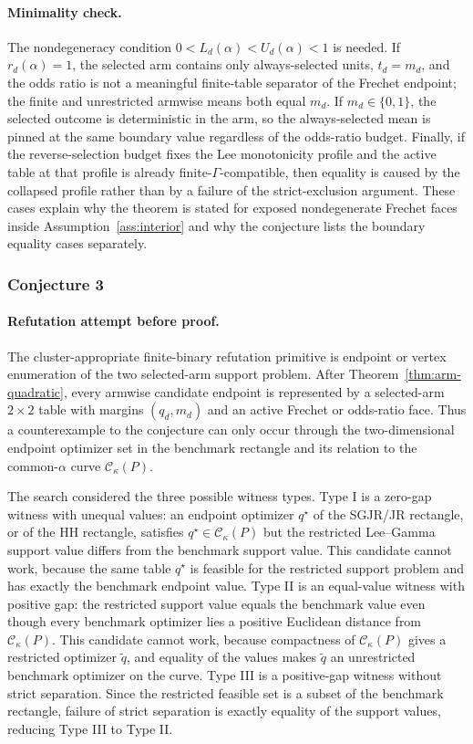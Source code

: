 \documentclass[11pt]{article}
\theoremstyle{definition}
\theoremstyle{plain}
\theoremstyle{remark}
\begin{document}
\paragraph{Minimality check.}
The nondegeneracy condition \(0<L_d(\alpha)<U_d(\alpha)<1\) is needed.  If
\(r_d(\alpha)=1\), the selected arm contains only always-selected units,
\(t_d=m_d\), and the odds ratio is not a meaningful finite-table separator of
the Frechet endpoint; the finite and unrestricted armwise means both equal
\(m_d\).  If \(m_d\in\{0,1\}\), the selected outcome is deterministic in the
arm, so the always-selected mean is pinned at the same boundary value
regardless of the odds-ratio budget.  Finally, if the reverse-selection budget
fixes the Lee monotonicity profile and the active table at that profile is
already finite-\(\Gamma\)-compatible, then equality is caused by the collapsed
profile rather than by a failure of the strict-exclusion argument.  These cases
explain why the theorem is stated for exposed nondegenerate Frechet faces
inside Assumption~\ref{ass:interior} and why the conjecture lists the boundary
equality cases separately.

\subsubsection*{Conjecture 3}
\paragraph{Refutation attempt before proof.}
The cluster-appropriate finite-binary refutation primitive is endpoint or
vertex enumeration of the two selected-arm support problem.  After
Theorem~\ref{thm:arm-quadratic}, every armwise candidate endpoint is
represented by a selected-arm \(2\times2\) table with margins \((q_d,m_d)\) and
an active Frechet or odds-ratio face.  Thus a counterexample to the conjecture
can only occur through the two-dimensional endpoint optimizer set in the
benchmark rectangle and its relation to the common-\(\alpha\) curve
\(\mathcal C_\kappa(P)\).

The search considered the three possible witness types.  Type I is a zero-gap
witness with unequal values: an endpoint optimizer \(q^\star\) of the SGJR/JR
rectangle, or of the HH rectangle, satisfies \(q^\star\in\mathcal C_\kappa(P)\)
but the restricted Lee--Gamma support value differs from the benchmark support
value.  This candidate cannot work, because the same table \(q^\star\) is
feasible for the restricted support problem and has exactly the benchmark
endpoint value.  Type II is an equal-value witness with positive gap: the
restricted support value equals the benchmark value even though every benchmark
optimizer lies a positive Euclidean distance from \(\mathcal C_\kappa(P)\).
This candidate cannot work, because compactness of \(\mathcal C_\kappa(P)\)
gives a restricted optimizer \(\tilde q\), and equality of the values makes
\(\tilde q\) an unrestricted benchmark optimizer on the curve.  Type III is a
positive-gap witness without strict separation.  Since the restricted feasible
set is a subset of the benchmark rectangle, failure of strict separation is
exactly equality of the support values, reducing Type III to Type II.
\end{document}
